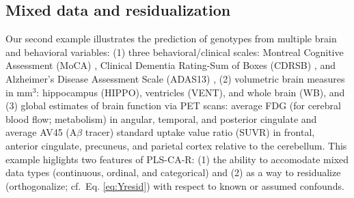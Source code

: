 \documentclass[12pt]{article}
\begin{document}
\hypertarget{mixed-data-and-residualization}{%
\subsection{Mixed data and
residualization}\label{mixed-data-and-residualization}}

\label{section:mixed}

Our second example illustrates the prediction of genotypes from multiple
brain and behavioral variables: (1) three behavioral/clinical scales:
Montreal Cognitive Assessment (MoCA) \citep{nasreddine_montreal_2005},
Clinical Dementia Rating-Sum of Boxes (CDRSB)
\citep{morris1993clinical}, and Alzheimer's Disease Assessment Scale
(ADAS13) \citep{skinner_alzheimers_2012}, (2) volumetric brain measures
in \(\textrm{mm}^3\): hippocampus (HIPPO), ventricles (VENT), and whole
brain (WB), and (3) global estimates of brain function via PET scans:
average FDG (for cerebral blood flow; metabolism) in angular, temporal,
and posterior cingulate and average AV45 (A\(\beta\) tracer) standard
uptake value ratio (SUVR) in frontal, anterior cingulate, precuneus, and
parietal cortex relative to the cerebellum. This example higlights two
features of PLS-CA-R: (1) the ability to accomodate mixed data types
(continuous, ordinal, and categorical) and (2) as a way to residualize
(orthogonalize; cf.~Eq. \ref{eq:Yresid}) with respect to known or
assumed confounds.
\end{document}
